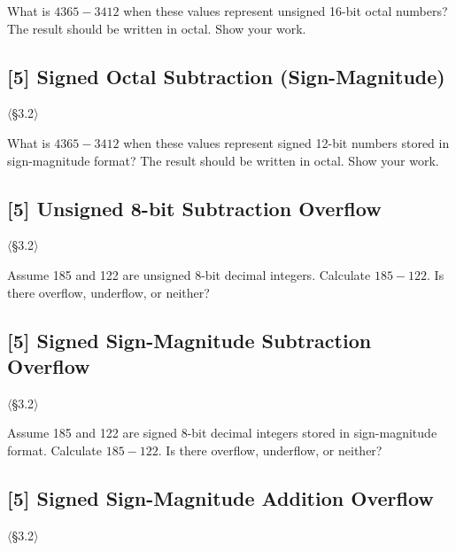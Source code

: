\noindent What is $4365 - 3412$ when these values represent unsigned 16-bit
octal numbers? The result should be written in octal. Show your work.

\problembreak

\subsection{[5] Signed Octal Subtraction (Sign-Magnitude)}
\hypertarget{prob-3.5}{}
\noindent$\langle$\S3.2$\rangle$\medskip

\noindent What is $4365 - 3412$ when these values represent signed 12-bit
numbers stored in sign-magnitude format? The result should be written in
octal. Show your work.

\problembreak

\subsection{[5] Unsigned 8-bit Subtraction Overflow}
\hypertarget{prob-3.6}{}
\noindent$\langle$\S3.2$\rangle$\medskip

\noindent Assume 185 and 122 are unsigned 8-bit decimal integers. Calculate
$185 - 122$. Is there overflow, underflow, or neither?

\problembreak

\subsection{[5] Signed Sign-Magnitude Subtraction Overflow}
\hypertarget{prob-3.7}{}
\noindent$\langle$\S3.2$\rangle$\medskip

\noindent Assume 185 and 122 are signed 8-bit decimal integers stored in
sign-magnitude format. Calculate $185 - 122$. Is there overflow, underflow,
or neither?

\problembreak

\subsection{[5] Signed Sign-Magnitude Addition Overflow}
\hypertarget{prob-3.8}{}
\noindent$\langle$\S3.2$\rangle$\medskip

